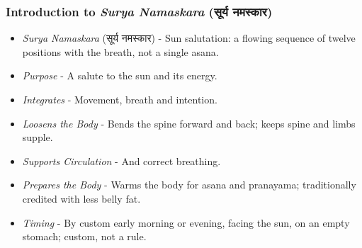 
\begin{frame}[fragile]\frametitle{Introduction to \textit{Surya Namaskara} (सूर्य नमस्कार)}

  \begin{itemize}
	\item \textit{Surya Namaskara} (सूर्य नमस्कार) - Sun salutation: a flowing sequence of twelve positions with the breath, not a single asana.
	\item \textit{Purpose} - A salute to the sun and its energy.
	\item \textit{Integrates} - Movement, breath and intention.
	\item \textit{Loosens the Body} - Bends the spine forward and back; keeps spine and limbs supple.
	\item \textit{Supports Circulation} - And correct breathing.
	\item \textit{Prepares the Body} - Warms the body for asana and pranayama; traditionally credited with less belly fat.
	\item \textit{Timing} - By custom early morning or evening, facing the sun, on an empty stomach; custom, not a rule.
  \end{itemize}
\end{frame}






